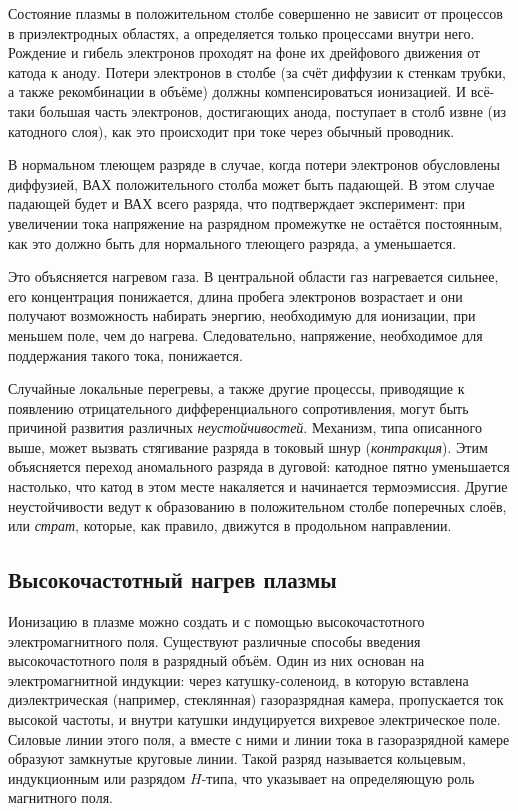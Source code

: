 Состояние плазмы в положительном столбе совершенно не зависит от процессов в приэлектродных областях, а определяется
только процессами внутри него. Рождение и гибель электронов проходят на фоне их дрейфового движения от катода к аноду.
Потери электронов в столбе (за счёт диффузии к стенкам трубки, а также рекомбинации в объёме) должны компенсироваться
ионизацией. И всё-таки большая часть электронов, достигающих анода, поступает в столб извне (из катодного слоя), как это
происходит при токе через обычный проводник.

В нормальном тлеющем разряде в случае, когда потери электронов обусловлены диффузией, ВАХ положительного столба может
быть падающей. В этом случае падающей будет и ВАХ всего разряда, что подтверждает эксперимент: при увеличении тока
напряжение на разрядном промежутке не остаётся постоянным, как это должно быть для нормального тлеющего разряда, а
уменьшается.

Это объясняется нагревом газа. В центральной области газ нагревается сильнее, его концентрация понижается, длина пробега
электронов возрастает и они получают возможность набирать энергию, необходимую для ионизации, при меньшем поле, чем до
нагрева. Следовательно, напряжение, необходимое для поддержания такого тока, понижается.

Случайные локальные перегревы, а также другие процессы, приводящие к появлению отрицательного дифференциального
сопротивления, могут быть причиной развития различных \textit{неустойчивостей}. Механизм, типа описанного выше, может
вызвать стягивание разряда в токовый шнур (\textit{контракция}). Этим объясняется переход аномального разряда в дуговой:
катодное пятно уменьшается настолько, что катод в этом месте накаляется и начинается термоэмиссия. Другие неустойчивости
ведут к образованию в положительном столбе поперечных слоёв, или \textit{страт}, которые, как правило, движутся в
продольном направлении.

\subsection*{Высокочастотный нагрев плазмы}

Ионизацию в плазме можно создать и с помощью высокочастотного электромагнитного поля. Существуют различные способы
введения высокочастотного поля в разрядный объём. Один из них основан на электромагнитной индукции: через
катушку-соленоид, в которую вставлена диэлектрическая (например, стеклянная) газоразрядная камера, пропускается ток
высокой частоты, и внутри катушки индуцируется вихревое электрическое поле. Силовые линии этого поля, а вместе с ними и
линии тока в газоразрядной камере образуют замкнутые круговые линии. Такой разряд называется кольцевым, индукционным или
разрядом $H$-типа, что указывает на определяющую роль магнитного поля.

